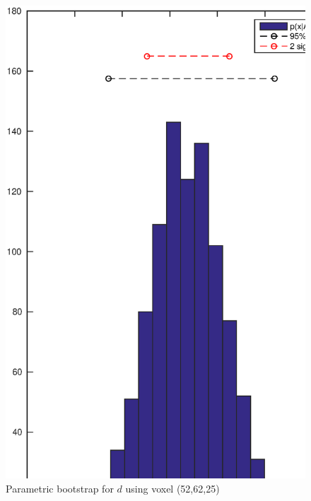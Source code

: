\documentclass[11pt,a4paper,oneside]{report}
\begin{document}
\begin{figure}[H]
      \centering
    \includegraphics[scale=1]{figures/q2/q121-p2.eps}
    \caption{Parametric bootstrap for $d$ using voxel (52,62,25)}
    \label{q121-p2}
\end{figure}
\end{document}
